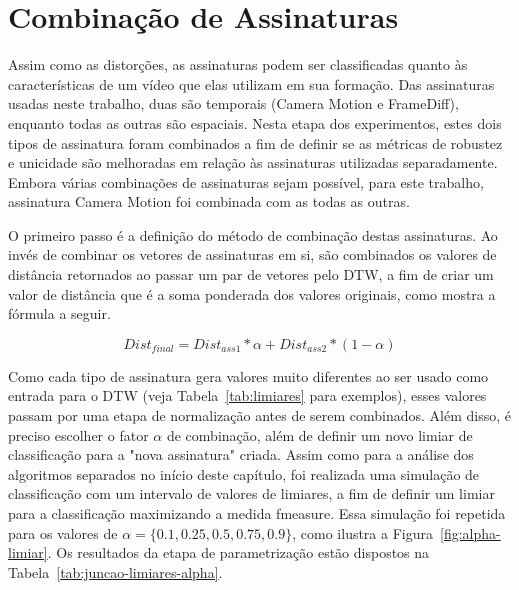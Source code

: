 \section{Combinação de Assinaturas}

Assim como as distorções, as assinaturas podem ser classificadas quanto às características de um vídeo que elas utilizam em sua formação. Das assinaturas usadas neste trabalho, duas são temporais (Camera Motion e FrameDiff), enquanto todas as outras são espaciais. Nesta etapa dos experimentos, estes dois tipos de assinatura foram combinados a fim de definir se as métricas de robustez e unicidade são melhoradas em relação às assinaturas utilizadas separadamente. Embora várias combinações de assinaturas sejam possível, para este trabalho, assinatura Camera Motion foi combinada com as todas as outras. 

O primeiro passo é a definição do método de combinação destas assinaturas. Ao invés de combinar os vetores de assinaturas em si, são combinados os valores de distância retornados ao passar um par de vetores pelo DTW, a fim de criar um valor de distância que é a soma ponderada dos valores originais, como mostra a fórmula a seguir.

$$
Dist_{final} = Dist_{ass1} * \alpha + Dist_{ass2} * (1-\alpha)
$$

Como cada tipo de assinatura gera valores muito diferentes ao ser usado como entrada para o DTW (veja Tabela~\ref{tab:limiares} para exemplos), esses valores passam por uma etapa de normalização antes de serem combinados. Além disso, é preciso escolher o fator $\alpha$ de combinação, além de definir um novo limiar de classificação para a "nova assinatura" criada. Assim como para a análise dos algoritmos separados no início deste capítulo, foi realizada uma simulação de classificação com um intervalo de valores de limiares, a fim de definir um limiar para a classificação maximizando a medida fmeasure. Essa simulação foi repetida para os valores de $\alpha = \{0.1, 0.25, 0.5, 0.75, 0.9\}$, como ilustra a Figura~\ref{fig:alpha-limiar}. Os resultados da etapa de parametrização estão dispostos na Tabela~\ref{tab:juncao-limiares-alpha}.

